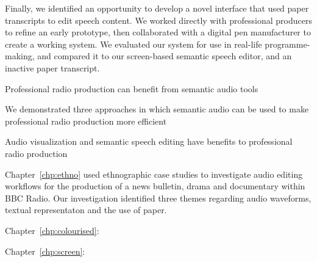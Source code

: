 Finally, we identified an opportunity to develop a novel interface that used paper transcripts to edit speech content.
We worked directly with professional producers to refine an early prototype, then collaborated with a digital pen
manufacturer to create a working system.
We evaluated our system for use in real-life programme-making, and compared it to our screen-based semantic speech
editor, and an inactive paper transcript.


Professional radio production can benefit from semantic audio tools

We demonstrated three approaches in which semantic audio can be used to make professional radio production more
efficient

Audio visualization and semantic speech editing have benefits to professional radio production





Chapter~\ref{chp:ethno} used ethnographic case studies to investigate audio editing workflows for the production of a
news bulletin, drama and documentary within BBC Radio. Our investigation identified three themes regarding audio
waveforms, textual representaton and the use of paper.

Chapter~\ref{chp:colourised}:




Chapter~\ref{chp:screen}:

